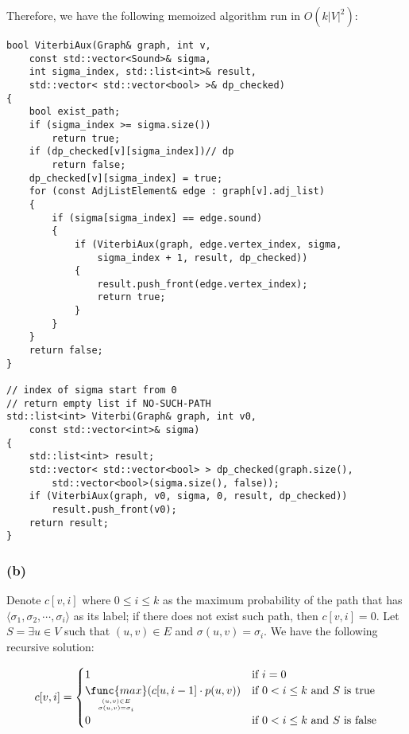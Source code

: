 \noindent
Therefore, we have the following memoized algorithm run in $O(k|V|^2)$:

\begin{verbatim}
bool ViterbiAux(Graph& graph, int v, 
    const std::vector<Sound>& sigma, 
    int sigma_index, std::list<int>& result, 
    std::vector< std::vector<bool> >& dp_checked)
{
    bool exist_path;
    if (sigma_index >= sigma.size())
        return true;
    if (dp_checked[v][sigma_index])// dp
        return false;
    dp_checked[v][sigma_index] = true;
    for (const AdjListElement& edge : graph[v].adj_list)
    {
        if (sigma[sigma_index] == edge.sound)
        {
            if (ViterbiAux(graph, edge.vertex_index, sigma, 
                sigma_index + 1, result, dp_checked))
            {
                result.push_front(edge.vertex_index);
                return true;
            }
        }
    }
    return false;
}

// index of sigma start from 0
// return empty list if NO-SUCH-PATH
std::list<int> Viterbi(Graph& graph, int v0, 
    const std::vector<int>& sigma)
{
    std::list<int> result;
    std::vector< std::vector<bool> > dp_checked(graph.size(), 
        std::vector<bool>(sigma.size(), false));
    if (ViterbiAux(graph, v0, sigma, 0, result, dp_checked))
        result.push_front(v0);
    return result;
}
\end{verbatim}

\subsubsection*{(b)}

\noindent
Denote $c[v,i]$ where $0 \leq i \leq k$ as the maximum probability
of the path that has 
$\langle \sigma_1, \sigma_2, \cdots, \sigma_i \rangle$ 
as its label; 
if there does not exist such path, then $c[v,i] = 0$.
Let $S = \exists u \in V$ such that $(u,v) \in E$ and $\sigma(u,v) = \sigma_i$.
We have the following recursive solution:

\begin{equation*}
    c[v,i] = 
    \begin{cases}
        1 & \text{if } i = 0 \\
        \mathop{\func{max}}\limits_{(u,v) \in E 
            \atop \sigma(u,v) = \sigma_i}
            (c[u,i-1] \cdot p(u,v))
            & \text{if } 0 < i \leq k \text{ and } S \text{ is true} \\
        0 & \text{if } 0 < i \leq k \text{ and } S \text{ is false}
    \end{cases}
\end{equation*}

